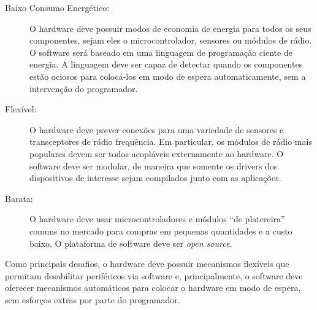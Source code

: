 \documentclass[titlepage,12pt]{article}
\begin{document}
\begin{description}
%
\item[Baixo Consumo Energético:]
  O hardware deve possuir modos de economia de energia para todos os seus
  componentes, sejam eles o microcontrolador, sensores ou módulos de rádio.
  O software será baseado em uma linguagem de programação ciente de energia.
  A linguagem deve ser capaz de detectar quando os componentes estão ociosos
  para colocá-los em modo de espera automaticamente, sem a intervenção do
  programador.
%
\item[Flexível:]
  O hardware deve prever conexões para uma variedade de sensores e
  transceptores de rádio frequência.
  Em particular, os módulos de rádio mais populares devem ser todos acopláveis
  externamente ao hardware.
  O software deve ser modular, de maneira que somente os drivers dos
  dispositivos de interesse sejam compilados junto com as aplicações.
%
\item[Barata:]
  O hardware deve usar microcontroladores e módulos ``de platereira'' comuns no
  mercado para compras em pequenas quantidades e a custo baixo.
  O plataforma de software deve ser \emph{open source}.
%
\end{description}

Como principais desafios, o hardware deve possuir mecanismos flexíveis que
permitam desabilitar periféricos via software e, principalmente, o software
deve oferecer mecanismos automáticos para colocar o hardware em modo de espera,
sem esforços extras por parte do programador.
\end{document}
